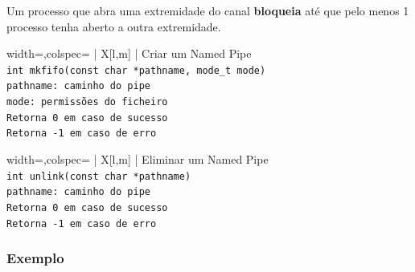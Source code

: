 \documentclass[11pt]{article}
\begin{document}
Um processo que abra uma extremidade do canal \textbf{bloqueia} até que pelo menos 1 processo tenha aberto a outra extremidade.

\begin{tblr}{width=\linewidth,colspec={ | X[l,m] | }}
    \hline
    \centering Criar um Named Pipe                            \\\hline
    \lstinline|int mkfifo(const char *pathname, mode_t mode)| \\\hline
    \lstinline|pathname: caminho do pipe|                     \\
    \lstinline|mode: permissões do ficheiro|                  \\\hline
    \lstinline|Retorna 0 em caso de sucesso|                  \\
    \lstinline|Retorna -1 em caso de erro|                    \\\hline
\end{tblr}

\begin{tblr}{width=\linewidth,colspec={ | X[l,m] | }}
    \hline
    \centering Eliminar um Named Pipe            \\\hline
    \lstinline|int unlink(const char *pathname)| \\\hline
    \lstinline|pathname: caminho do pipe|        \\\hline
    \lstinline|Retorna 0 em caso de sucesso|     \\
    \lstinline|Retorna -1 em caso de erro|       \\\hline
\end{tblr}

\subsubsection*{Exemplo}
\end{document}
